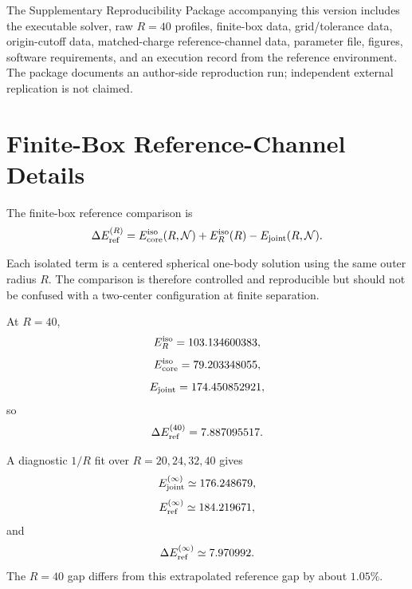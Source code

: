 \documentclass[11pt]{article}
\begin{document}
The Supplementary Reproducibility Package accompanying this version includes the executable solver, raw \(R=40\) profiles, finite-box data, grid/tolerance data, origin-cutoff data, matched-charge reference-channel data, parameter file, figures, software requirements, and an execution record from the reference environment. The package documents an author-side reproduction run; independent external replication is not claimed.

\section{Finite-Box Reference-Channel Details}

The finite-box reference comparison is
\begin{equation}
\Delta E_{\rm ref}^{(R)}
=
E_{\rm core}^{\rm iso}(R,\mathcal N)
+
E_R^{\rm iso}(R)
-
E_{\rm joint}(R,\mathcal N).
\end{equation}

Each isolated term is a centered spherical one-body solution using the same outer radius \(R\). The comparison is therefore controlled and reproducible but should not be confused with a two-center configuration at finite separation.

At \(R=40\),
\begin{equation}
E_R^{\rm iso}
=
103.134600383,
\end{equation}
\begin{equation}
E_{\rm core}^{\rm iso}
=
79.203348055,
\end{equation}
\begin{equation}
E_{\rm joint}
=
174.450852921,
\end{equation}
so
\begin{equation}
\Delta E_{\rm ref}^{(40)}
=
7.887095517.
\end{equation}

A diagnostic \(1/R\) fit over \(R=20,24,32,40\) gives
\begin{equation}
E_{\rm joint}^{(\infty)}
\simeq176.248679,
\end{equation}
\begin{equation}
E_{\rm ref}^{(\infty)}
\simeq184.219671,
\end{equation}
and
\begin{equation}
\Delta E_{\rm ref}^{(\infty)}
\simeq7.970992.
\end{equation}
The \(R=40\) gap differs from this extrapolated reference gap by about \(1.05\%\).
\end{document}
